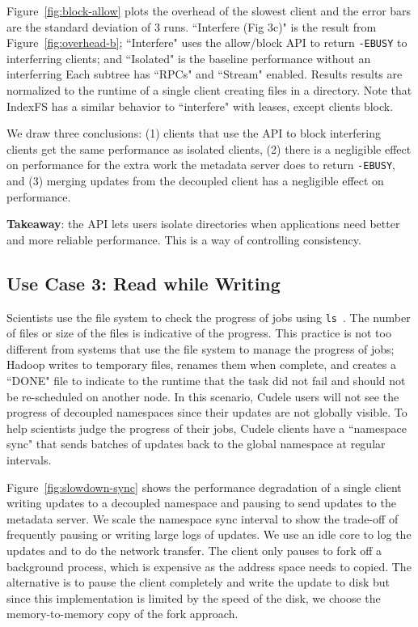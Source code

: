 Figure~\ref{fig:block-allow} plots the overhead of the slowest client and the
error bars are the standard deviation of 3 runs.  ``Interfere (Fig 3c)" is the
result from Figure~\ref{fig:overhead-b}; ``Interfere" uses the allow/block API
to return \texttt{-EBUSY} to interferring clients; and ``Isolated" is the
baseline performance without an interferring Each subtree has ``RPCs" and
``Stream" enabled.  Results results are normalized to the runtime of a single
client creating files in a directory. Note that IndexFS has a similar behavior
to ``interfere" with leases, except clients block. 

We draw three conclusions: (1) clients that use the API to block interfering
clients  get the same performance as isolated clients, (2) there is a
negligible effect on performance for the extra work the metadata server does to
return \texttt{-EBUSY}, and (3) merging updates from the decoupled client has a
negligible effect on performance.

\textbf{Takeaway}: the API lets users isolate directories when applications
need better and more reliable performance. This is a way of controlling
consistency.

\subsection{Use Case 3: Read while Writing}

Scientists use the file system to check the progress of jobs using
\texttt{ls}~\cite{CITEME}. The number of files or size of the files is
indicative of the progress. This practice is not too different from systems
that use the file system to manage the progress of jobs; Hadoop writes to
temporary files, renames them when complete, and creates a ``DONE" file to
indicate to the runtime that the task did not fail and should not be
re-scheduled on another node. In this scenario, Cudele users will not see the
progress of decoupled namespaces since their updates are not globally visible.
To help scientists judge the progress of their jobs, Cudele clients have a
``namespace sync" that sends batches of updates back to the global namespace at
regular intervals.

Figure~\ref{fig:slowdown-sync} shows the performance degradation of a single
client writing updates to a decoupled namespace and pausing to send updates to
the metadata server. We scale the namespace sync interval to show the trade-off
of frequently pausing or writing large logs of updates.  We use an idle core to
log the updates and to do the network transfer. The client only pauses to fork
off a background process, which is expensive as the address space needs to
copied. The alternative is to pause the client completely and write the update
to disk but since this implementation is limited by the speed of the disk, we
choose the memory-to-memory copy of the fork approach.

